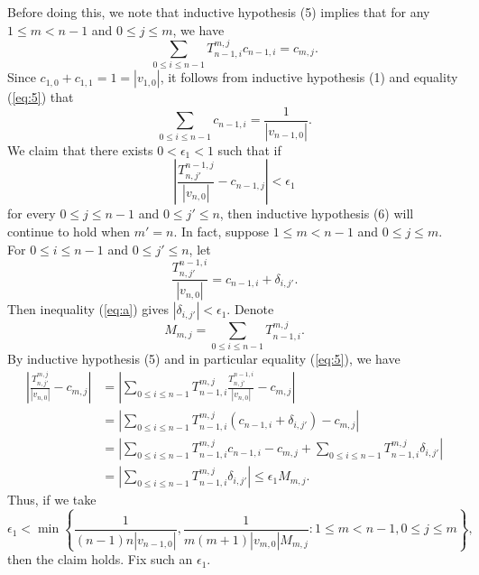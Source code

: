 \documentclass{amsart}
\theoremstyle{definition}
\theoremstyle{problem}
\theoremstyle{remark}
\numberwithin{equation}{section}
\begin{document}
Before doing this, we note that inductive hypothesis (5) implies that for any $1\leq m<n-1$ and $0\leq j\leq m$, we have
\begin{equation}\label{eq:5}
\displaystyle\sum_{0\leq i\leq n-1}T^{m,j}_{n-1,i}c_{n-1,i}=c_{m,j}.\tag{*}
\end{equation}
Since $c_{1,0}+c_{1,1}=1=|v_{1,0}|$, it follows from inductive hypothesis (1) and equality (\ref{eq:5}) that
\begin{equation}\label{eq:c}
\displaystyle\sum_{0\leq i\leq n-1}c_{n-1,i}=\displaystyle\frac{1}{|v_{n-1,0}|}. \tag{**}
\end{equation}
We claim that there exists $0<\epsilon_1<1$ such that if 
\begin{equation}\label{eq:a}\left|\frac{T^{n-1,j}_{n,j'}}{|v_{n,0}|}-c_{n-1,j} \right|<\epsilon_1\tag{***}
\end{equation}
for every $0\le j\le n-1$ and $0\le j'\le n$, then inductive hypothesis (6) will continue to hold when $m'=n$.  In fact, suppose $1\leq m<n-1$ and $0\leq j\leq m$. For $0\leq i\leq n-1$ and $0\leq j'\leq n$, let 
$$ \frac{T^{n-1,i}_{n,j'}}{|v_{n,0}|}=c_{n-1,i}+\delta_{i,j'}. $$
Then inequality (\ref{eq:a}) gives $|\delta_{i,j'}|<\epsilon_1$. Denote
$$ M_{m,j}=\displaystyle\sum_{0\leq i\leq n-1}T^{m,j}_{n-1,i}. $$
By inductive hypothesis (5) and in particular equality (\ref{eq:5}), we have
\begin{align*}
\left|\frac{T^{m,j}_{n,j'}}{|v_{n,0}|}-c_{m,j}\right| &=\left|\sum_{0\le i\le n-1}T^{m,j}_{n-1,i}\frac{T^{n-1,i}_{n,j'}}{|v_{n,0}|}-c_{m,j}\right|\\
&=\left|\sum_{0\le i\le n-1}T^{m,j}_{n-1,i}(c_{n-1,i}+\delta_{i,j'})-c_{m,j}\right|\\
&=\left|\sum_{0\le i\le n-1}T^{m,j}_{n-1,i}c_{n-1,i}-c_{m,j}+\sum_{0\leq i\leq n-1}T^{m,j}_{n-1,i}\delta_{i,j'}\right|\\
&= \left| \sum_{0\leq i\leq n-1}T^{m,j}_{n-1,i}\delta_{i,j'}\right| \le \epsilon_1M_{m,j}.
\end{align*}
Thus, if we take 
$$\epsilon_1<\min\left\{\displaystyle\frac{1}{(n-1)n|v_{n-1,0}|}, \displaystyle\frac{1}{m(m+1)|v_{m,0}|M_{m,j}}\colon 1\le m<n-1, 0\le j \le m\right\},$$
then the claim holds. Fix such an $\epsilon_1$.
\end{document}
